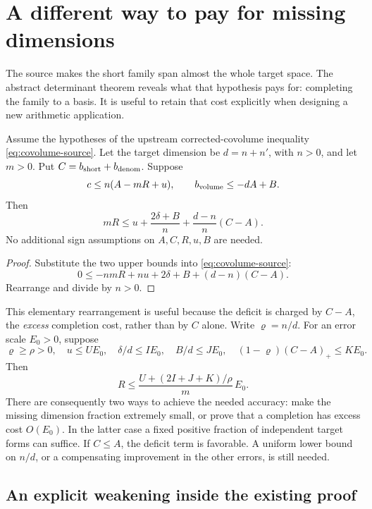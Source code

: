 \section{A different way to pay for missing dimensions}\label{sec:rank}

The source makes the short family span almost the whole target space. The abstract determinant theorem reveals what that hypothesis pays for: completing the family to a basis. It is useful to retain that cost explicitly when designing a new arithmetic application.

\begin{proposition}\label{prop:rank}
Assume the hypotheses of the upstream corrected-covolume inequality \eqref{eq:covolume-source}. Let the target dimension be $d=n+n'$, with $n>0$, and let $m>0$. Put $C=b_{\rm short}+b_{\rm denom}$. Suppose
\[
 c\le n(A-mR+u),\qquad b_{\rm volume}\le-dA+B.
\]
Then
\begin{equation}\label{eq:rank-cost}
 \boxed{\displaystyle
 mR\le u+\frac{2\delta+B}{n}
             +\frac{d-n}{n}(C-A).}
\end{equation}
No additional sign assumptions on $A,C,R,u,B$ are needed.
\end{proposition}

\begin{proof}
Substitute the two upper bounds into \eqref{eq:covolume-source}:
\[
 0\le -nmR+nu+2\delta+B+(d-n)(C-A).
\]
Rearrange and divide by $n>0$.
\end{proof}

This elementary rearrangement is useful because the deficit is charged by $C-A$, the \emph{excess} completion cost, rather than by $C$ alone. Write $\varrho=n/d$. For an error scale $E_0>0$, suppose
\[
 \varrho\ge\rho>0,\quad
 u\le UE_0,\quad \delta/d\le IE_0,\quad B/d\le JE_0,\quad
 (1-\varrho)(C-A)_+\le KE_0.
\]
Then
\begin{equation}\label{eq:rank-error}
 R\le\frac{U+(2I+J+K)/\rho}{m}\,E_0.
\end{equation}
There are consequently two ways to achieve the needed accuracy: make the missing dimension fraction extremely small, or prove that a completion has excess cost $O(E_0)$. In the latter case a fixed positive fraction of independent target forms can suffice. If $C\le A$, the deficit term is favorable. A uniform lower bound on $n/d$, or a compensating improvement in the other errors, is still needed.

\subsection{An explicit weakening inside the existing proof}

